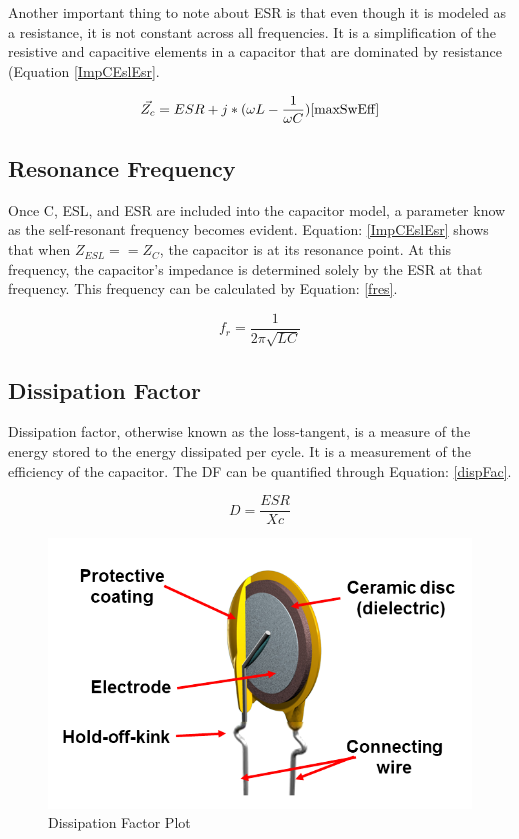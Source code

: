 Another important thing to note about ESR is that even though it is modeled as a resistance, it is not constant across all frequencies. It is a simplification of the resistive and capacitive elements in a capacitor that are dominated by resistance (Equation \eqref{ImpCEslEsr}.

\begin{equation}
\label{ImpCEslEsr}
\vec{Z_c} = ESR + j * (\omega L - \frac{1}{\omega C})
\cite{maxSwEff}
\end{equation}


\subsection{Resonance Frequency}

Once C, ESL, and ESR are included into the capacitor model, a parameter know as the self-resonant frequency becomes evident. Equation: \eqref{ImpCEslEsr} shows that when $Z_{ESL} == Z_C$, the capacitor is at its resonance point. At this frequency, the capacitor's impedance is determined solely by the ESR at that frequency. This frequency can be calculated by Equation: \eqref{fres}.

\begin{equation}
\label{fres}
f_r = \frac{1}{2\pi \sqrt{LC}}
\end{equation}

\subsection{Dissipation Factor}

Dissipation factor, otherwise known as the loss-tangent, is a measure of the energy stored to the energy dissipated per cycle. It is a measurement of the efficiency of the capacitor. The DF can be quantified through Equation: \eqref{dispFac}. 

\begin{equation}
\label{dispFac}
D = \frac{ESR}{Xc}
\end{equation}

\begin{figure}
    \includegraphics[keepaspectratio=true,scale=.5]{./figures/testImage.png}
    \centering
    \caption{Dissipation Factor Plot}
    \label{dfPlot}
\end{figure}

